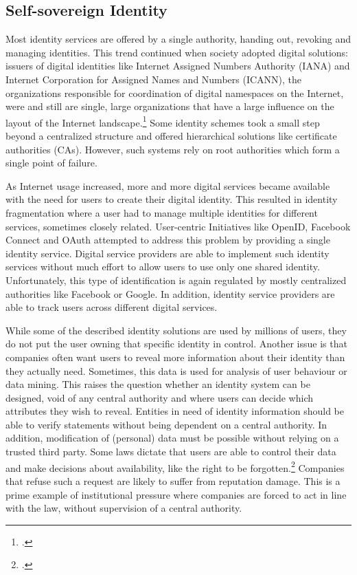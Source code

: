 \documentclass[USenglish]{article}
\begin{document}
\subsection{Self-sovereign Identity}
\label{subsec:ssi}

Most identity services are offered by a single authority, handing out, revoking and managing identities.
This trend continued when society adopted digital solutions: issuers of digital identities like Internet Assigned Numbers Authority (IANA) and Internet Corporation for Assigned Names and Numbers (ICANN), the organizations responsible for coordination of digital namespaces on the Internet, were and still are single, large organizations that have a large influence on the layout of the Internet landscape.\footcite{pathtossi}
Some identity schemes took a small step beyond a centralized structure and offered hierarchical solutions like certificate authorities (CAs).
However, such systems rely on root authorities which form a single point of failure.

As Internet usage increased, more and more digital services became available with the need for users to create their digital identity.
This resulted in identity fragmentation where a user had to manage multiple identities for different services, sometimes closely related.
User-centric Initiatives like OpenID, Facebook Connect and OAuth attempted to address this problem by providing a single identity service.
Digital service providers are able to implement such identity services without much effort to allow users to use only one shared identity.
Unfortunately, this type of identification is again regulated by mostly centralized authorities like Facebook or Google.
In addition, identity service providers are able to track users across different digital services.

While some of the described identity solutions are used by millions of users, they do not put the user owning that specific identity in control.
Another issue is that companies often want users to reveal more information about their identity than they actually need.
Sometimes, this data is used for analysis of user behaviour or data mining.
This raises the question whether an identity system can be designed, void of any central authority and where users can decide which attributes they wish to reveal.
Entities in need of identity information should be able to verify statements without being dependent on a central authority.
In addition, modification of (personal) data must be possible without relying on a trusted third party.
Some laws dictate that users are able to control their data and make decisions about availability, like the right to be forgotten.\footcite{dataportabilityeu}
Companies that refuse such a request are likely to suffer from reputation damage.
This is a prime example of institutional pressure where companies are forced to act in line with the law, without supervision of a central authority.
\end{document}
